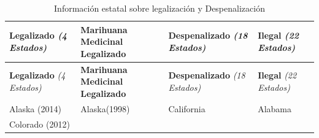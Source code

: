 \documentclass[11pt,]{article}
\begin{document}
\begin{longtable}[]{@{}llll@{}}
\caption{Información estatal sobre legalización y
Despenalización}\tabularnewline
\toprule
\begin{minipage}[b]{0.20\columnwidth}\raggedright
\textbf{Legalizado} \emph{(4 Estados)}\strut
\end{minipage} & \begin{minipage}[b]{0.26\columnwidth}\raggedright
\textbf{Marihuana Medicinal Legalizado}\strut
\end{minipage} & \begin{minipage}[b]{0.24\columnwidth}\raggedright
\textbf{Despenalizado} \emph{(18 Estados)}\strut
\end{minipage} & \begin{minipage}[b]{0.19\columnwidth}\raggedright
\textbf{Ilegal} \emph{(22 Estados)}\strut
\end{minipage}\tabularnewline
\midrule
\endfirsthead
\toprule
\begin{minipage}[b]{0.20\columnwidth}\raggedright
\textbf{Legalizado} \emph{(4 Estados)}\strut
\end{minipage} & \begin{minipage}[b]{0.26\columnwidth}\raggedright
\textbf{Marihuana Medicinal Legalizado}\strut
\end{minipage} & \begin{minipage}[b]{0.24\columnwidth}\raggedright
\textbf{Despenalizado} \emph{(18 Estados)}\strut
\end{minipage} & \begin{minipage}[b]{0.19\columnwidth}\raggedright
\textbf{Ilegal} \emph{(22 Estados)}\strut
\end{minipage}\tabularnewline
\midrule
\endhead
\begin{minipage}[t]{0.20\columnwidth}\raggedright
Alaska (2014)\strut
\end{minipage} & \begin{minipage}[t]{0.26\columnwidth}\raggedright
Alaska(1998)\strut
\end{minipage} & \begin{minipage}[t]{0.24\columnwidth}\raggedright
California\strut
\end{minipage} & \begin{minipage}[t]{0.19\columnwidth}\raggedright
Alabama\strut
\end{minipage}\tabularnewline
\begin{minipage}[t]{0.20\columnwidth}\raggedright
Colorado (2012)\strut
\end{minipage} & \begin{minipage}[t]{0.26\columnwidth}\raggedright

\end{minipage}
\end{longtable}
\end{document}
